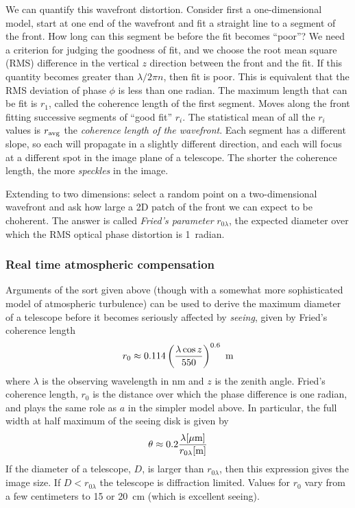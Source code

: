 We can quantify this wavefront distortion. Consider first a
one-dimensional model, start at one end of the wavefront and fit a
straight line to a segment of the front. How long can this segment be
before the fit becomes ``poor''? We need a criterion for judging the
goodness of fit, and we choose the root mean square (RMS) difference in the
vertical $z$ direction between the front and the fit. If this quantity
becomes greater than $\lambda/2\pi n$, then fit is poor. This is
equivalent that the RMS deviation of phase $\phi$ is less than one
radian. The maximum length that can be fit is $r_1$, called the
coherence length of the first segment. Moves along the front
fitting successive segments of ``good fit'' $r_i$. The statistical
mean of all the $r_i$ values is $r_{\rm avg}$ the {\it coherence
  length of the wavefront}. Each segment has a different slope, so
each will propagate in a slightly different direction, and each will
focus at a different spot in the image plane of a telescope. The
shorter the coherence length, the more {\it speckles} in the image.

Extending to two dimensions: select a random point on a
two-dimensional wavefront and ask how large a 2D patch of the front we
can expect to be choherent. The answer is called {\it Fried's
  parameter} $r_{0\lambda}$, the expected diameter over which the RMS
optical phase distortion is 1~radian.

\subsubsection{Real time atmospheric compensation}

Arguments of the sort given above (though with a somewhat more sophisticated
model of atmospheric turbulence) can be used to derive the maximum diameter
of a telescope before it becomes seriously affected by {\it seeing}, given
by Fried's coherence length 
\[
r_0\approx 0.114\left({\lambda\cos z\over 550}\right)^{0.6}~{\rm m}
\]
where $\lambda$ is the observing wavelength in nm and $z$ is the zenith 
angle. Fried's coherence length, $r_0$ is the distance over which the 
phase difference is one radian, and plays the same role as $a$ in the simpler
model above. In particular, the full width at half maximum of the
seeing disk is given by 
\[
\theta\approx 0.2{\lambda[\mu\mathrm{m}]\over r_{0\lambda}[\mathrm{m}]}
\]
If the diameter of a telescope, $D$, is larger than $r_{0\lambda}$,
then this expression gives the image size. If $D<r_{0\lambda}$ the
telescope is diffraction limited. Values for $r_0$ vary from a few
centimeters to 15 or 20~cm (which is excellent seeing).

